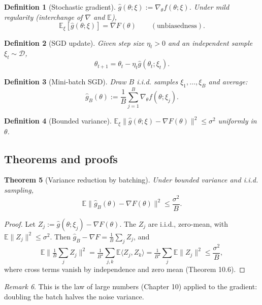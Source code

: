 \documentclass[11pt]{article}
\newtheorem{theorem}{Theorem}[section]
\newtheorem{definition}[theorem]{Definition}
\theoremstyle{remark}
\newtheorem{remark}[theorem]{Remark}
\begin{document}
\begin{definition}[Stochastic gradient]
$\hat g(\theta; \xi) := \nabla_\theta f(\theta; \xi)$. Under mild regularity (interchange of $\nabla$ and $\mathbb{E}$),
\[
\mathbb{E}_{\xi}[\hat g(\theta; \xi)] = \nabla F(\theta) \qquad (\text{unbiasedness}).
\]
\end{definition}

\begin{definition}[SGD update]
Given step size $\eta_t > 0$ and an independent sample $\xi_t \sim \mathcal{D}$,
\[
\theta_{t+1} = \theta_t - \eta_t \hat g(\theta_t; \xi_t).
\]
\end{definition}

\begin{definition}[Mini-batch SGD]
Draw $B$ i.i.d. samples $\xi_1, \dots, \xi_B$ and average:
\[
\hat g_B(\theta) := \frac{1}{B} \sum_{j=1}^{B} \nabla_\theta f(\theta; \xi_j).
\]
\end{definition}

\begin{definition}[Bounded variance]
$\mathbb{E}_\xi \|\hat g(\theta; \xi) - \nabla F(\theta)\|^2 \leq \sigma^2$ uniformly in $\theta$.
\end{definition}

\subsection*{Theorems and proofs}

\begin{theorem}[Variance reduction by batching]
Under bounded variance and i.i.d. sampling,
\[
\mathbb{E}\|\hat g_B(\theta) - \nabla F(\theta)\|^2 \leq \frac{\sigma^2}{B}.
\]
\end{theorem}

\begin{proof}
Let $Z_j := \hat g(\theta; \xi_j) - \nabla F(\theta)$. The $Z_j$ are i.i.d., zero-mean, with $\mathbb{E}\|Z_j\|^2 \leq \sigma^2$. Then $\hat g_B - \nabla F = \tfrac{1}{B}\sum_j Z_j$, and
\[
\mathbb{E}\Big\|\tfrac{1}{B}\sum_j Z_j\Big\|^2 = \tfrac{1}{B^2}\sum_{j,k} \mathbb{E}\langle Z_j, Z_k\rangle = \tfrac{1}{B^2}\sum_j \mathbb{E}\|Z_j\|^2 \leq \frac{\sigma^2}{B},
\]
where cross terms vanish by independence and zero mean (Theorem 10.6).
\end{proof}

\begin{remark}
This is the law of large numbers (Chapter 10) applied to the gradient: doubling the batch halves the noise variance.
\end{remark}
\end{document}

